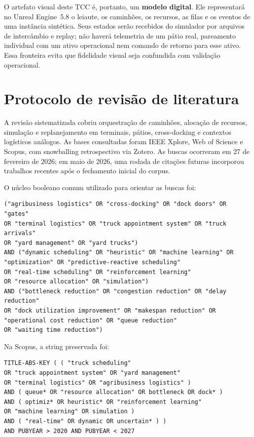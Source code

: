 \documentclass[
  12pt,
  oneside,
  a4paper,
  sumario=tradicional,
  brazil
]{abntex2}
\begin{document}
O artefato visual deste TCC \'e, portanto, um \textbf{modelo digital}. Ele representar\'a no
Unreal Engine~5.8 o leiaute, os caminh\~oes, os recursos, as filas e os eventos de uma
inst\^ancia sint\'etica. Seus estados ser\~ao recebidos do simulador por arquivos de
interc\^ambio e replay; n\~ao haver\'a telemetria de um p\'atio real, pareamento individual
com um ativo operacional nem comando de retorno para esse ativo. Essa fronteira evita que
fidelidade visual seja confundida com valida\c{c}\~ao operacional.

\section{Protocolo de revisão de literatura}\label{sec:protocolo-revisao}
A revis\~ao sistematizada cobriu orquestra\c{c}\~ao de caminh\~oes, aloca\c{c}\~ao de recursos, simula\c{c}\~ao e replanejamento em terminais, p\'atios, cross-docking e contextos log\'isticos an\'alogos. As bases consultadas foram IEEE Xplore, Web of Science e Scopus, com snowballing retrospectivo via Zotero. As buscas ocorreram em 27 de fevereiro de 2026; em maio de 2026, uma rodada de cita\c{c}\~oes futuras incorporou trabalhos recentes ap\'os o fechamento inicial do corpus.

O n\'ucleo booleano comum utilizado para orientar as buscas foi:
{\scriptsize
\begin{verbatim}
("agribusiness logistics" OR "cross-docking" OR "dock doors" OR "gates"
OR "terminal logistics" OR "truck appointment system" OR "truck arrivals"
OR "yard management" OR "yard trucks")
AND ("dynamic scheduling" OR "heuristic" OR "machine learning" OR
"optimization" OR "predictive-reactive scheduling"
OR "real-time scheduling" OR "reinforcement learning"
OR "resource allocation" OR "simulation")
AND ("bottleneck reduction" OR "congestion reduction" OR "delay reduction"
OR "dock utilization improvement" OR "makespan reduction" OR
"operational cost reduction" OR "queue reduction"
OR "waiting time reduction")
\end{verbatim}
}

Na Scopus, a string preservada foi:
{\scriptsize
\begin{verbatim}
TITLE-ABS-KEY ( ( "truck scheduling"
OR "truck appointment system" OR "yard management"
OR "terminal logistics" OR "agribusiness logistics" )
AND ( queue* OR "resource allocation" OR bottleneck OR dock* )
AND ( optimiz* OR heuristic* OR "reinforcement learning"
OR "machine learning" OR simulation )
AND ( "real-time" OR dynamic OR uncertain* ) )
AND PUBYEAR > 2020 AND PUBYEAR < 2027
\end{verbatim}
}
\end{document}
